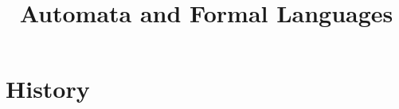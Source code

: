 \documentclass[a4paper]{article}
\begin{document}
\title{Automata and Formal Languages}

\maketitle

\newpage

\tableofcontents

\newpage

\section{History}
\end{document}
